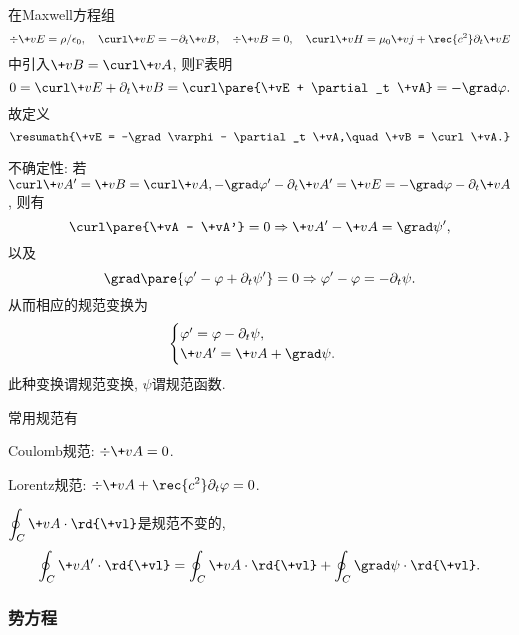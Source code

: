 \documentclass[hidelinks]{ctexart}
\begin{document}
在Maxwell方程组
\[ \div \+vE = \rho/\epsilon_0,\quad \curl \+vE = -\partial_t \+vB,\quad \div \+vB = 0,\quad \curl \+vH = \mu_0 \+vj + \rec{c^2}\partial_t \+vE \]
中引入$\+vB = \curl \+vA$, 则F表明
\[ 0 = \curl \+vE + \partial_t \+vB = \curl\pare{\+vE + \partial_t \+vA} = -\grad \varphi. \]
故定义
\[ \resumath{\+vE = -\grad \varphi - \partial_t \+vA,\quad \+vB = \curl \+vA.} \]
\begin{cenum}
    \item 不确定性: 若$\curl \+vA' = \+vB = \curl \+vA, -\grad \varphi' - \partial_t \+vA' = \+vE = -\grad \varphi - \partial_t \+vA$, 则有
    \[ \curl \pare{\+vA - \+vA'} = 0 \Rightarrow \+vA' - \+vA = \grad \psi', \]
    以及
    \[ \grad\pare{\varphi' - \varphi + \partial_t \psi'} = 0\Rightarrow \varphi' - \varphi = -\partial_t \psi. \]
    从而相应的规范变换为
    \[ \begin{cases}
        \varphi' = \varphi - \partial_t \psi,\\
        \+vA' = \+vA + \grad \psi.
    \end{cases} \]
    此种变换谓规范变换, $\psi$谓规范函数.
\end{cenum}
\par
常用规范有
\begin{cenum}
    \item Coulomb规范: $\div \+vA = 0$.
    \item Lorentz规范: $\displaystyle \div \+vA + \rec{c^2}\partial_t \varphi = 0$.
\end{cenum}
$\displaystyle \oint_C \+vA\cdot \rd{\+vl}$是规范不变的,
\[ \oint_C \+vA'\cdot \rd{\+vl} = \oint_C \+vA\cdot \rd{\+vl} + \oint_C \grad \psi \cdot \rd{\+vl}. \]

\subsubsection{势方程} %
\label{ssub:势方程}
\end{document}
